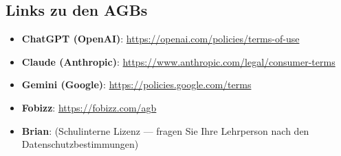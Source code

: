 \subsection{Links zu den AGBs}\label{sec:agb-links}

\begin{itemize}
    \item \textbf{ChatGPT (OpenAI)}: \url{https://openai.com/policies/terms-of-use}
    \item \textbf{Claude (Anthropic)}: \url{https://www.anthropic.com/legal/consumer-terms}
    \item \textbf{Gemini (Google)}: \url{https://policies.google.com/terms}
    \item \textbf{Fobizz}: \url{https://fobizz.com/agb}
    \item \textbf{Brian}: (Schulinterne Lizenz --- fragen Sie Ihre Lehrperson nach
          den Datenschutzbestimmungen)
\end{itemize}

